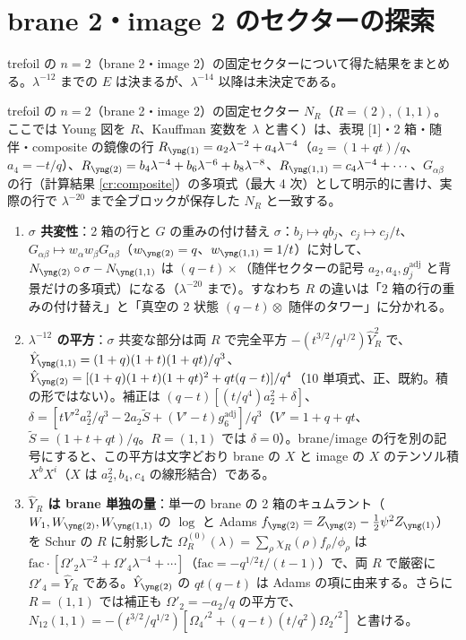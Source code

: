 \section{brane 2・image 2 のセクターの探索}\label{app:n2}
trefoil の $n = 2$（brane 2・image 2）の固定セクターについて得た結果をまとめる。$\lambda^{-12}$ までの $E$ は決まるが、$\lambda^{-14}$ 以降は未決定である。
\begin{compresult}[$n = 2$ の行の母関数と $R$ 依存性]\label{cr:n2rows}
trefoil の $n = 2$（brane 2・image 2）の固定セクター $N_R$（$R = (2), (1,1)$。ここでは Young 図を $R$、Kauffman 変数を $\lambda$ と書く）は、表現 [1]・2 箱・随伴・composite の鏡像の行 $R_{\yone} = a_2\lambda^{-2} + a_4\lambda^{-4}$（$a_2 = (1+qt)/q$、$a_4 = -t/q$）、$R_{\ytwo} = b_4\lambda^{-4} + b_6\lambda^{-6} + b_8\lambda^{-8}$、$R_{\yoneone} = c_4\lambda^{-4} + \cdots$、$G_{\alpha\beta}$ の行（計算結果 \ref{cr:composite}）の多項式（最大 4 次）として明示的に書け、実際の行で $\lambda^{-20}$ まで全ブロックが保存した $N_R$ と一致する。
\begin{enumerate}
\item \textbf{$\sigma$ 共変性}：2 箱の行と $G$ の重みの付け替え $\sigma$：$b_j \mapsto qb_j$、$c_j \mapsto c_j/t$、$G_{\alpha\beta} \mapsto w_\alpha w_\beta G_{\alpha\beta}$（$w_{\ytwo} = q$、$w_{\yoneone} = 1/t$）に対して、$N_{\ytwo}\circ\sigma - N_{\yoneone}$ は $(q-t)\times$（随伴セクターの記号 $a_2, a_4, g^{\mathrm{adj}}_j$ と背景だけの多項式）になる（$\lambda^{-20}$ まで）。すなわち $R$ の違いは「2 箱の行の重みの付け替え」と「真空の 2 状態 $(q-t)\otimes$ 随伴のタワー」に分かれる。
\item \textbf{$\lambda^{-12}$ の平方}：$\sigma$ 共変な部分は両 $R$ で完全平方 $-(t^{3/2}/q^{1/2})\hat Y_R^2$ で、$\hat Y_{\yoneone} = (1+q)(1+t)(1+qt)/q^3$、$\hat Y_{\ytwo} = [(1+q)(1+t)(1+qt)^2 + qt(q-t)]/q^4$（10 単項式、正、既約。積の形ではない）。補正は $(q-t)[(t/q^4)a_2^2 + \delta]$、$\delta = [tV'^2a_2^2/q^3 - 2a_2\tilde S + (V'-t)g^{\mathrm{adj}}_6]/q^3$（$V' = 1+q+qt$、$\tilde S = (1+t+qt)/q$。$R = (1,1)$ では $\delta = 0$）。brane/image の行を別の記号にすると、この平方は文字どおり brane の $X$ と image の $X$ のテンソル積 $X^bX^i$（$X$ は $a_2^2, b_4, c_4$ の線形結合）である。
\item \textbf{$\hat Y_R$ は brane 単独の量}：単一の brane の 2 箱のキュムラント（$W_1, W_{\ytwo}, W_{\yoneone}$ の $\log$ と Adams $f_{\ytwo} = Z_{\ytwo} - \tfrac12\psi^2 Z_{\yone}$）を Schur の $R$ に射影した $\Omega^{(0)}_R(\lambda) = \sum_\rho \chi_R(\rho)f_\rho/\phi_\rho$ は $\mathrm{fac}\cdot[\Omega'_2\lambda^{-2} + \Omega'_4\lambda^{-4} + \cdots]$（$\mathrm{fac} = -q^{1/2}t/(t-1)$）で、両 $R$ で厳密に $\Omega'_4 = \hat Y_R$ である。$\hat Y_{\ytwo}$ の $qt(q-t)$ は Adams の項に由来する。さらに $R = (1,1)$ では補正も $\Omega'_2 = -a_2/q$ の平方で、$N_{12}(1,1) = -(t^{3/2}/q^{1/2})[\Omega_4'^2 + (q-t)(t/q^2)\Omega_2'^2]$ と書ける。
\end{enumerate}
\end{compresult}

